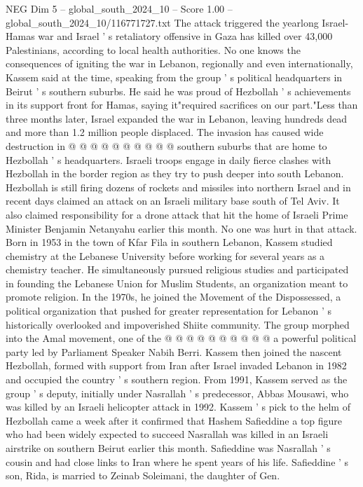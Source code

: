 \begin{textsample}{NEG Dim 5 – global\_south\_2024\_10 – Score 1.00 – global\_south\_2024\_10/116771727.txt}
The attack triggered the yearlong Israel-Hamas war and Israel ' s retaliatory offensive in Gaza has killed over 43,000 Palestinians, according to local health authorities.
No one knows the consequences of igniting the war in Lebanon, regionally and even internationally, Kassem said at the time, speaking from the group ' s political headquarters in Beirut ' s southern suburbs.
He said he was proud of Hezbollah ' s achievements in its support front for Hamas, saying it"required sacrifices on our part."Less than three months later, Israel expanded the war in Lebanon, leaving hundreds dead and more than 1.2 million people displaced.
The invasion has caused wide destruction in @ @ @ @ @ @ @ @ @ @ southern suburbs that are home to Hezbollah ' s headquarters.
Israeli troops engage in daily fierce clashes with Hezbollah in the border region as they try to push deeper into south Lebanon.
Hezbollah is still firing dozens of rockets and missiles into northern Israel and in recent days claimed an attack on an Israeli military base south of Tel Aviv.
It also claimed responsibility for a drone attack that hit the home of Israeli Prime Minister Benjamin Netanyahu earlier this month.
No one was hurt in that attack.
Born in 1953 in the town of Kfar Fila in southern Lebanon, Kassem studied chemistry at the Lebanese University before working for several years as a chemistry teacher.
He simultaneously pursued religious studies and participated in founding the Lebanese Union for Muslim Students, an organization meant to promote religion.
In the 1970s, he joined the Movement of the Dispossessed, a political organization that pushed for greater representation for Lebanon ' s historically overlooked and impoverished Shiite community.
The group morphed into the Amal movement, one of the @ @ @ @ @ @ @ @ @ @ a powerful political party led by Parliament Speaker Nabih Berri.
Kassem then joined the nascent Hezbollah, formed with support from Iran after Israel invaded Lebanon in 1982 and occupied the country ' s southern region.
From 1991, Kassem served as the group ' s deputy, initially under Nasrallah ' s predecessor, Abbas Mousawi, who was killed by an Israeli helicopter attack in 1992.
Kassem ' s pick to the helm of Hezbollah came a week after it confirmed that Hashem Safieddine a top figure who had been widely expected to succeed Nasrallah was killed in an Israeli airstrike on southern Beirut earlier this month.
Safieddine was Nasrallah ' s cousin and had close links to Iran where he spent years of his life.
Safieddine ' s son, Rida, is married to Zeinab Soleimani, the daughter of Gen.

\end{textsample}

